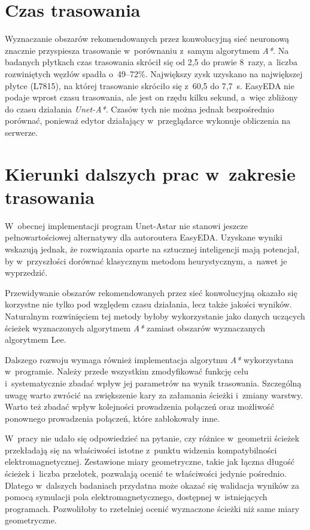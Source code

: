 \section{Czas trasowania}

Wyznaczanie obszarów rekomendowanych przez konwolucyjną sieć neuronową
znacznie przyspiesza trasowanie w~porównaniu z~samym algorytmem
\emph{A*}. Na badanych płytkach czas trasowania skrócił się od 2,5 do
prawie 8~razy, a~liczba rozwiniętych węzłów spadła o~49--72\%.
Największy zysk uzyskano na największej płytce (L7815), na której
trasowanie skróciło się z~60,5 do 7,7~s. EasyEDA nie podaje wprost czasu
trasowania, ale jest on rzędu kilku sekund, a~więc zbliżony do czasu
działania \emph{Unet-A*}. Czasów tych nie można jednak bezpośrednio
porównać, ponieważ edytor działający w~przeglądarce wykonuje obliczenia
na serwerze.

\section{Kierunki dalszych prac w~zakresie trasowania}

W~obecnej implementacji program Unet-Astar nie stanowi jeszcze
pełnowartościowej alternatywy dla autoroutera EasyEDA. Uzyskane wyniki
wskazują jednak, że rozwiązania oparte na sztucznej inteligencji mają
potencjał, by w~przyszłości dorównać klasycznym metodom heurystycznym,
a~nawet je wyprzedzić.

Przewidywanie obszarów rekomendowanych przez sieć konwolucyjną okazało
się korzystne nie tylko pod względem czasu działania, lecz także jakości
wyników. Naturalnym rozwinięciem tej metody byłoby wykorzystanie jako
danych uczących ścieżek wyznaczonych algorytmem \emph{A*} zamiast
obszarów wyznaczanych algorytmem Lee.

Dalszego rozwoju wymaga również implementacja algorytmu \emph{A*}
wykorzystana w~programie. Należy przede wszystkim zmodyfikować funkcję
celu i~systematycznie zbadać wpływ jej parametrów na wynik trasowania.
Szczególną uwagę warto zwrócić na zwiększenie kary za załamania ścieżki
i~zmiany warstwy. Warto też zbadać wpływ kolejności prowadzenia połączeń
oraz możliwość ponownego prowadzenia połączeń, które zablokowały inne.

W~pracy nie udało się odpowiedzieć na pytanie, czy różnice w~geometrii
ścieżek przekładają się na właściwości istotne z~punktu widzenia
kompatybilności elektromagnetycznej. Zestawione miary geometryczne, takie jak
łączna długość ścieżek i~liczba przelotek, pozwalają ocenić te
właściwości jedynie pośrednio. Dlatego w~dalszych badaniach przydatna
może okazać się walidacja wyników za pomocą symulacji pola
elektromagnetycznego, dostępnej w~istniejących programach. Pozwoliłoby
to rzetelniej ocenić wyznaczone ścieżki niż same miary geometryczne.

